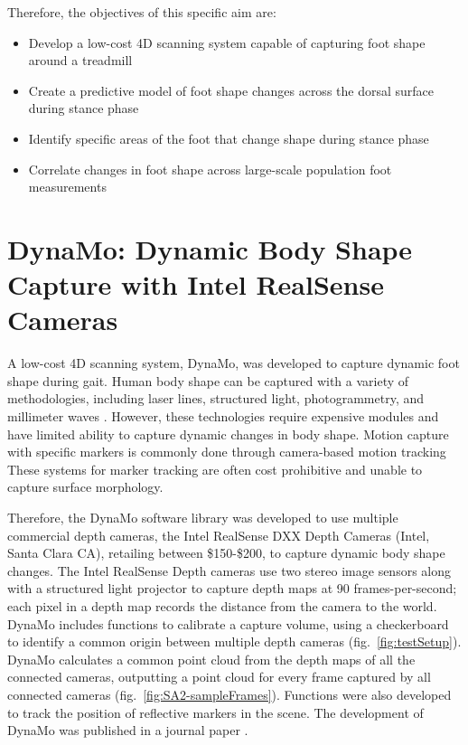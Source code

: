\documentclass[defaultstyle,11pt]{comps}
\providecommand{\tightlist}{%
  \setlength{\itemsep}{0pt}\setlength{\parskip}{0pt}}
\begin{document}
Therefore, the objectives of this specific aim are:

\begin{itemize}
\tightlist
\item
  Develop a low-cost 4D scanning system capable of capturing foot shape around a treadmill
\item
  Create a predictive model of foot shape changes across the dorsal surface during stance phase
\item
  Identify specific areas of the foot that change shape during stance phase
\item
  Correlate changes in foot shape across large-scale population foot measurements
\end{itemize}

\hypertarget{dynamo-dynamic-body-shape-capture-with-intel-realsense-cameras}{%
\section{DynaMo: Dynamic Body Shape Capture with Intel RealSense Cameras}\label{dynamo-dynamic-body-shape-capture-with-intel-realsense-cameras}}

A low-cost 4D scanning system, DynaMo, was developed to capture dynamic foot shape during gait.
Human body shape can be captured with a variety of methodologies, including laser lines, structured light, photogrammetry, and millimeter waves \citep{Daanen2013}.
However, these technologies require expensive modules and have limited ability to capture dynamic changes in body shape.
Motion capture with specific markers is commonly done through camera-based motion tracking \citep{Windolf2008}
These systems for marker tracking are often cost prohibitive and unable to capture surface morphology.

Therefore, the DynaMo software library was developed to use multiple commercial depth cameras, the Intel RealSense DXX Depth Cameras (Intel, Santa Clara CA), retailing between \$150-\$200, to capture dynamic body shape changes.
The Intel RealSense Depth cameras use two stereo image sensors along with a structured light projector to capture depth maps at 90 frames-per-second; each pixel in a depth map records the distance from the camera to the world.
DynaMo includes functions to calibrate a capture volume, using a checkerboard to identify a common origin between multiple depth cameras (fig.~\ref{fig:testSetup}).
DynaMo calculates a common point cloud from the depth maps of all the connected cameras, outputting a point cloud for every frame captured by all connected cameras (fig.~\ref{fig:SA2-sampleFrames}).
Functions were also developed to track the position of reflective markers in the scene.
The development of DynaMo was published in a journal paper \citep{Boppana2019}.
\end{document}
